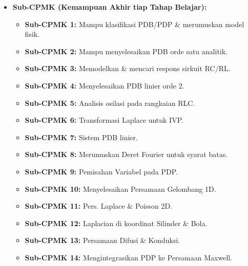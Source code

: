 \documentclass[11pt,a4paper]{article}
\begin{document}
\begin{itemize}[leftmargin=*, label=$\bullet$]
    \item \textbf{Sub-CPMK (Kemampuan Akhir tiap Tahap Belajar):}
    \begin{itemize}[leftmargin=*, label=$\circ$]
        \item \textbf{Sub-CPMK 1:} Mampu klasifikasi PDB/PDP \& merumuskan model fisik.
        \item \textbf{Sub-CPMK 2:} Mampu menyelesaikan PDB orde satu analitik.
        \item \textbf{Sub-CPMK 3:} Memodelkan \& mencari respons sirkuit RC/RL.
        \item \textbf{Sub-CPMK 4:} Menyelesaikan PDB linier orde 2.
        \item \textbf{Sub-CPMK 5:} Analisis osilasi pada rangkaian RLC.
        \item \textbf{Sub-CPMK 6:} Transformasi Laplace untuk IVP.
        \item \textbf{Sub-CPMK 7:} Sistem PDB linier.
        \item \textbf{Sub-CPMK 8:} Merumuskan Deret Fourier untuk syarat batas.
        \item \textbf{Sub-CPMK 9:} Pemisahan Variabel pada PDP.
        \item \textbf{Sub-CPMK 10:} Menyelesaikan Persamaan Gelombang 1D.
        \item \textbf{Sub-CPMK 11:} Pers. Laplace \& Poisson 2D.
        \item \textbf{Sub-CPMK 12:} Laplacian di koordinat Silinder \& Bola.
        \item \textbf{Sub-CPMK 13:} Persamaan Difusi \& Konduksi.
        \item \textbf{Sub-CPMK 14:} Mengintegrasikan PDP ke Persamaan Maxwell.
    \end{itemize}
\end{itemize}

\newpage
\end{document}
